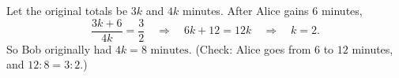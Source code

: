 Let the original totals be $3k$ and $4k$ minutes. After Alice gains $6$ minutes,
\[\dfrac{3k+6}{4k}=\dfrac32\quad\Longrightarrow\quad 6k+12=12k\quad\Longrightarrow\quad k=2.\]
So Bob originally had $4k=\boxed{8\text{ minutes}}$. (Check: Alice goes from $6$ to $12$ minutes, and $12:8=3:2$.)
